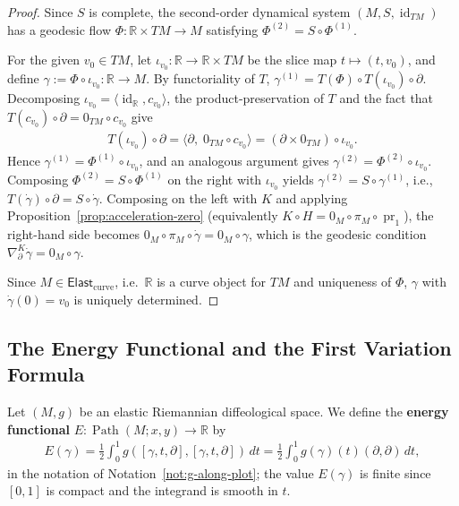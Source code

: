 \documentclass{amsart}
\newcommand{\R}{\mathbb{R}}
\DeclareMathOperator{\Path}{Path}
\DeclareMathOperator{\pr}{pr}
\DeclareMathOperator{\id}{id}
\theoremstyle{definition}
\begin{document}
\begin{proof}
  Since $S$ is complete, the second-order dynamical
  system $(M, S, \id_{TM})$ has a geodesic flow
  $\Phi \colon \R \times TM \to M$ satisfying
  $\Phi^{(2)} = S \circ \Phi^{(1)}$.

  For the given $v_0 \in TM$, let $\iota_{v_0} \colon \R \to \R \times TM$
  be the slice map $t \mapsto (t, v_0)$, and define
  $\gamma := \Phi \circ \iota_{v_0} \colon \R \to M$.
  By functoriality of $T$,
  $\gamma^{(1)} = T(\Phi) \circ T(\iota_{v_0}) \circ \partial$.
  Decomposing $\iota_{v_0} = \langle \id_\R, c_{v_0} \rangle$,
  the product-preservation of $T$ and the fact that
  $T(c_{v_0}) \circ \partial = 0_{TM} \circ c_{v_0}$ give
  \begin{align*}
    T(\iota_{v_0}) \circ \partial
      = \langle \partial,\; 0_{TM} \circ c_{v_0} \rangle
      = (\partial \times 0_{TM}) \circ \iota_{v_0}.
  \end{align*}
  Hence $\gamma^{(1)} = \Phi^{(1)} \circ \iota_{v_0}$,
  and an analogous argument gives $\gamma^{(2)} = \Phi^{(2)} \circ \iota_{v_0}$.
  Composing $\Phi^{(2)} = S \circ \Phi^{(1)}$ on the right with $\iota_{v_0}$
  yields $\gamma^{(2)} = S \circ \gamma^{(1)}$, i.e.,
  $T(\dot{\gamma}) \circ \partial = S \circ \dot{\gamma}$.
  Composing on the left with $K$ and applying
  Proposition~\ref{prop:acceleration-zero} (equivalently
  $K \circ H = 0_M \circ \pi_M \circ \pr_1$),
  the right-hand side becomes
  $0_M \circ \pi_M \circ \dot{\gamma} = 0_M \circ \gamma$,
  which is the geodesic condition $\nabla^K_\partial \dot{\gamma} = 0_M \circ \gamma$.

  Since $M \in \mathsf{Elast}_{\mathrm{curve}}$, i.e.\ $\R$ is a curve object for
  $TM$ and uniqueness of $\Phi$, $\gamma$ with $\dot{\gamma}(0) = v_0$ is uniquely determined.
\end{proof}

\subsection{The Energy Functional and the First Variation Formula}%
\label{subsec:energy}

Let $(M, g)$ be an elastic Riemannian diffeological space.
We define the \textbf{energy functional}
$E \colon \Path(M; x, y) \to \R$ by
\begin{align}\label{eq:energy}
  E(\gamma)
    = \frac{1}{2}\int_0^1 g([\gamma, t, \partial], [\gamma, t, \partial]) \, dt
    = \frac{1}{2}\int_0^1 g(\gamma)(t)(\partial, \partial) \, dt,
\end{align}
in the notation of Notation~\ref{not:g-along-plot}; the value $E(\gamma)$ is
finite since $[0,1]$ is compact and the integrand is smooth in $t$.
\end{document}
